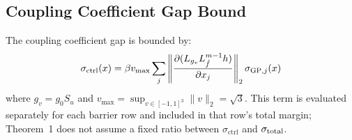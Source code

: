 \subsection{Coupling Coefficient Gap Bound}

The coupling coefficient gap is bounded by:
\begin{equation}
    \sigma_{\mathrm{ctrl}}(x) = \beta v_{\max} \sum_{j} \left\|\frac{\partial (L_{g_v} L_{\hat{f}}^{m-1} h)}{\partial x_j}\right\|_2 \sigma_{\mathrm{GP},j}(x)
    \label{eq:sigma_ctrl_app}
\end{equation}
where $g_v=g_0S_u$ and $v_{\max}=\sup_{v\in[-1,1]^3}\|v\|_2=\sqrt{3}$. This term is evaluated separately for each barrier row and included in that row's total margin; Theorem~1 does not assume a fixed ratio between $\sigma_{\mathrm{ctrl}}$ and $\sigma_{\mathrm{total}}$.
